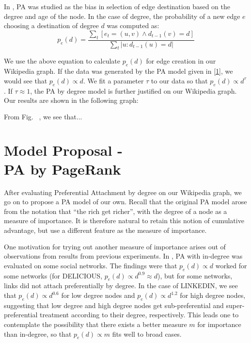 \documentclass[10pt]{article}
\begin{document}
\begin{multicols}{2}
In \cite{leskovec2008microscopic}, PA was studied as the bias in selection of edge destination based on the degree and age of the node. In the case of degree, the probability of a new edge $e$ choosing a destination of degree $d$ was computed as:
\begin{equation}
\label{2}
p_e(d)=\frac{\sum\limits_{t}[e_t=(u,v)\wedge d_{t-1}(v)=d]}{\sum\limits_{t}|u:d_{t-1}(u)=d|}
\end{equation}

We use the above equation to calculate $p_e(d)$ for edge creation in our Wikipedia graph. If the data was generated by the PA model given in \eqref{1}, we would see that $p_e(d)\propto d$. We fit a parameter $\tau$ to our data so that $p_e(d)\propto d^\tau$. If $\tau \approx 1$, the PA by degree model is further justified on our Wikipedia graph. Our results are shown in the following graph:

From Fig.~ , we see that...

\section{Model Proposal -\\ PA by PageRank}

After evaluating Preferential Attachment by degree on our Wikipedia graph, we go on to propose a PA model of our own. Recall that the original PA model arose from the notation that ``the rich get richer'', with the degree of a node as a measure of importance. It is therefore natural to retain this notion of cumulative advantage, but use a different feature as the measure of importance.

One motivation for trying out another measure of importance arises out of observations from results from previous experiments. In \cite{leskovec2008microscopic}, PA with in-degree was evaluated on some social networks. The findings were that $p_e(d)\propto d$ worked for some networks (for DELICIOUS, $p_e(d)\propto d^{0.9}\approx d$), but for some networks, links did not attach preferentially by degree. In the case of LINKEDIN, we see that $p_e(d)\propto d^{0.6}$ for low degree nodes and $p_e(d)\propto d^{1.2}$ for high degree nodes, suggesting that low degree and high degree nodes get sub-preferential and super-preferential treatment according to their degree, respectively. This leads one to contemplate the possibility that there exists a better measure $m$ for importance than in-degree, so that $p_e(d)\propto m$ fits well to broad cases. 


\end{multicols}
\end{document}
